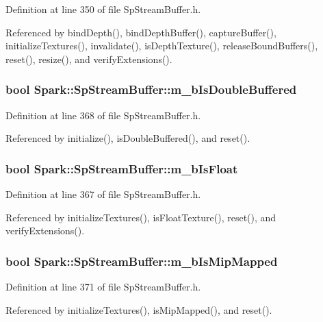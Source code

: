 Definition at line 350 of file Sp\-Stream\-Buffer.h.

Referenced by bind\-Depth(), bind\-Depth\-Buffer(), capture\-Buffer(), initialize\-Textures(), invalidate(), is\-Depth\-Texture(), release\-Bound\-Buffers(), reset(), resize(), and verify\-Extensions().
\subsubsection{\setlength{\rightskip}{0pt plus 5cm}bool {\bf Spark::Sp\-Stream\-Buffer::m\_\-b\-Is\-Double\-Buffered}\hspace{0.3cm}{\tt  [protected]}}\label{classSpark_1_1SpStreamBuffer_p15}


Definition at line 368 of file Sp\-Stream\-Buffer.h.

Referenced by initialize(), is\-Double\-Buffered(), and reset().
\subsubsection{\setlength{\rightskip}{0pt plus 5cm}bool {\bf Spark::Sp\-Stream\-Buffer::m\_\-b\-Is\-Float}\hspace{0.3cm}{\tt  [protected]}}\label{classSpark_1_1SpStreamBuffer_p14}


Definition at line 367 of file Sp\-Stream\-Buffer.h.

Referenced by initialize\-Textures(), is\-Float\-Texture(), reset(), and verify\-Extensions().
\subsubsection{\setlength{\rightskip}{0pt plus 5cm}bool {\bf Spark::Sp\-Stream\-Buffer::m\_\-b\-Is\-Mip\-Mapped}\hspace{0.3cm}{\tt  [protected]}}\label{classSpark_1_1SpStreamBuffer_p18}


Definition at line 371 of file Sp\-Stream\-Buffer.h.

Referenced by initialize\-Textures(), is\-Mip\-Mapped(), and reset().
